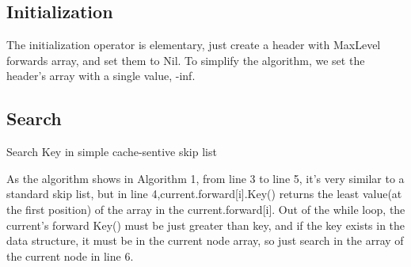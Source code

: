 \documentclass[sigconf, nonacm, letterpaper,top=2cm,bottom=2cm,left=3cm,right=3cm,marginparwidth=1.75cm]{acmart}
\begin{document}
\subsection{Initialization}
The initialization operator is elementary, just create a header with MaxLevel forwards array, and set them to Nil. To simplify the algorithm, we set the header's array with a single value, -inf.


\subsection{Search}
\begin{algorithm}
    \caption{Search Key in simple cache-sentive skip list}
\end{algorithm}

As the algorithm shows in Algorithm 1, from line 3 to line 5, it’s very similar to a standard skip list, but in line 4,current.forward[i].Key() returns the least value(at the first position) of the array in the current.forward[i]. Out of the while loop, the current’s forward Key() must be just greater than key, and if the key exists in the data structure, it must be in the current node array, so just search in the array of the current node in line 6.
\end{document}
